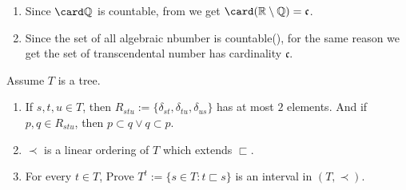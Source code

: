 \documentclass{ctexart}
\begin{document}
\begin{solution}
  \begin{enumerate}
    \item Since \(\card \mathbb{Q}\) is countable, from  we get \(\card(\mathbb{R} \setminus \mathbb{Q})=\mathfrak{c}\). 
    \item Since the set of all algebraic nbumber is countable(), for the same reason we get the set of transcendental number has cardinality \(\mathfrak{c}\). 
  \end{enumerate}
\end{solution}
\begin{problem}
  Assume \(T\) is a tree. 
  \begin{enumerate}[ref=\theproblem.\arabic*]
    \item \label{it:1}If \(s,t,u \in T\), then \(R_{stu} :=\{\delta_{st} ,\delta_{tu} ,\delta_{us} \}\) has at most \(2\) elements. 
      And if \(p,q \in R_{stu}\), then \(p \subset q \vee q \subset p\). 
    \item \label{it:2}\(\prec \) is a linear ordering of \(T\) which extends \(\sqsubset\). 
    \item \label{it:3}For every \(t \in T\), Prove \(T^t:=\{s \in T:t \sqsubset s\}\) is an interval in \((T,\prec)\). 
  \end{enumerate}
\end{problem}
\end{document}
